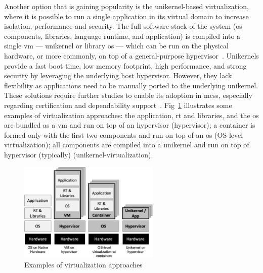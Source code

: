 Another option that is gaining popularity is the unikernel-based virtualization,
where it is possible to run a single application in its virtual domain to
increase isolation, performance and security. The full software stack of the
system (\gls{os} components, libraries, language runtime, and application) is
compiled into a single \gls{vm} --- unikernel or library \gls{os} --- which can
be run on the physical hardware, or more commonly, on top of a general-purpose
hypervisor~\cite{cinque2022virtualizing}. Unikernels provide a fast boot time,
low memory footprint, high performance, and strong security by leveraging the
underlying host hypervisor. However, they lack flexibility as applications need
to be manually ported to the underlying unikernel. These solutions require
further studies to enable its adoption in \glspl{mcs},
especially regarding certification and dependability
support~\cite{cinque2022virtualizing}. Fig~\ref{fig:virt-approaches-exs}
illustrates some examples of virtualization approaches: the application,
\gls{rt} and libraries, and the \gls{os} are bundled as a \gls{vm} and run on
top of an hypervisor (hypervisor); a container is formed only with the first two
components and run on top of an \gls{os} (OS-level virtualization); all
components are compiled into a unikernel and run on top of hypervisor
(typically) (unikernel-virtualization). 

\begin{figure}[!hbt]
  \centering
  \includegraphics[width=0.6\textwidth]{./img/jpg/virt-approaches-exs} 
%   
  \caption[Examples of virtualization approaches]{Examples of virtualization approaches~\cite{cinque2022virtualizing}\footnotemark}%
  \label{fig:virt-approaches-exs}
\end{figure}
%
%

